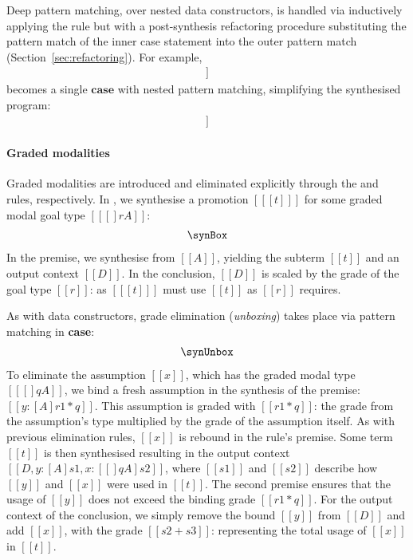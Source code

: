 Deep pattern matching, over nested data constructors, is handled via
inductively applying the \GRANULEdruleCaseName rule but with a
post-synthesis refactoring procedure substituting the pattern match of
the inner case statement into the outer pattern match
(Section~\ref{sec:refactoring}). For example,
\begin{align*}
  [[ case x of Pair y1 y2 -> case y1 of Pair z1 z2 -> z2 ]]
\end{align*}
becomes a single $\textbf{case}$ with nested pattern matching, simplifying the synthesised program:
\begin{align*}
  [[ case x of Pair {Pair z1 z2} y2 -> z2 ]]
\end{align*}

\paragraph{Graded modalities}

Graded modalities are introduced and eliminated explicitly through the \GRANULEdruleBoxName and \GRANULEdruleUnboxName rules, respectively. In \GRANULEdruleBoxName, we synthesise a promotion $[[ [ t ] ]]$ for some graded modal goal type $[[ [] r A ]]$:
\begin{align*}
  \synBox
\end{align*}
In the premise, we synthesise from $[[ A ]]$, yielding the subterm $[[ t ]]$ and an output context $[[ D ]]$. In the conclusion, $[[ D ]]$ is scaled by the grade of the goal type $[[ r ]]$: as $[[ [t] ]]$ must use $[[ t ]]$ as $[[ r ]]$ requires.

As with data constructors, grade elimination (\textit{unboxing}) takes place via pattern matching in \textbf{case}:
\begin{align*}
  \synUnbox
\end{align*}
To eliminate the assumption $[[ x ]]$, which has the graded modal type $[[ [] q A ]]$, we bind a fresh assumption in the synthesis of the premise: $[[ y : [A] {r1 * q} ]]$. This assumption is graded with $[[ {r1 * q} ]]$: the grade from the assumption's type multiplied by the grade of the assumption itself. As with previous elimination rules, $[[ x ]]$ is rebound in the rule's premise. Some term $[[ t ]]$ is then synthesised resulting in the output context $[[ {D, y : [A] s1}, x : [ [] q A ] {s2} ]]$, where $[[ s1 ]]$ and $[[ s2 ]]$ describe how $[[ y ]]$ and $[[ x ]]$ were used in $[[ t ]]$. The second premise ensures that the usage of $[[ y ]]$ does not exceed the binding grade $[[ r1 * q ]]$. For the output context of the conclusion, we simply remove the bound $[[y]]$ from $[[ D ]]$ and add $[[ x ]]$, with the grade $[[ s2 + s3 ]]$: representing the total usage of $[[ x ]]$ in $[[ t ]]$.

